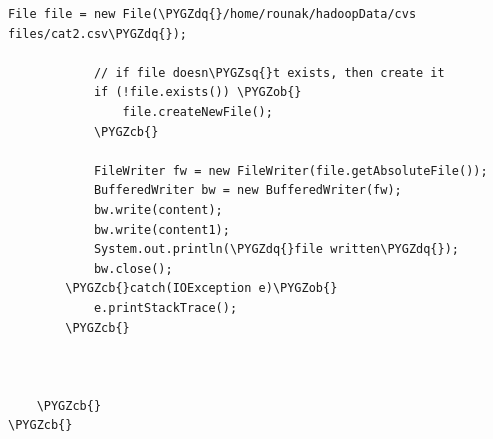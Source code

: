 \documentclass[a4paper,12pt,oneside]{sphinxmanual}
\def\PYGZob{\char`\{}
\def\PYGZcb{\char`\}}
\def\PYGZsq{\char`\'}
\def\PYGZdq{\char`\"}
\begin{document}
\begin{Verbatim}[commandchars=\\\{\}]
            File file = new File(\PYGZdq{}/home/rounak/hadoopData/cvs files/cat2.csv\PYGZdq{});

            // if file doesn\PYGZsq{}t exists, then create it
            if (!file.exists()) \PYGZob{}
                file.createNewFile();
            \PYGZcb{}

            FileWriter fw = new FileWriter(file.getAbsoluteFile());
            BufferedWriter bw = new BufferedWriter(fw);
            bw.write(content);
            bw.write(content1);
            System.out.println(\PYGZdq{}file written\PYGZdq{});
            bw.close();
        \PYGZcb{}catch(IOException e)\PYGZob{}
            e.printStackTrace();
        \PYGZcb{}



    \PYGZcb{}
\PYGZcb{}
\end{Verbatim}
\end{document}
